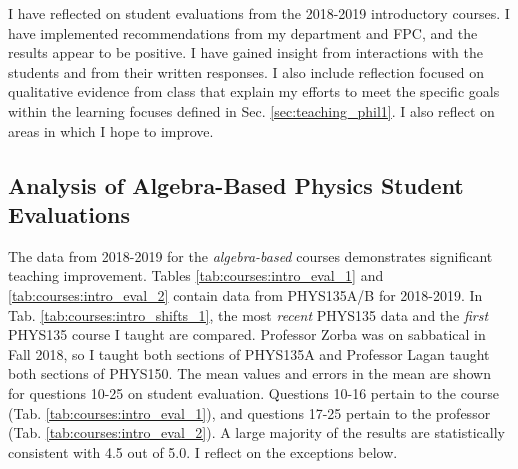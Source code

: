 \documentclass[../../main.tex]{subfiles}
\begin{document}
\label{sec:oof}

I have reflected on student evaluations from the 2018-2019 introductory courses.  I have implemented recommendations from my department and FPC, and the results appear to be positive.  I have gained insight from interactions with the students and from their written responses.  I also include reflection focused on qualitative evidence from class that explain my efforts to meet the specific goals within the learning focuses defined in Sec. \ref{sec:teaching_phil1}.  I also reflect on areas in which I hope to improve.  \\ \hspace{0.1cm}

\subsection{Analysis of Algebra-Based Physics Student Evaluations}

The data from 2018-2019 for the \textit{algebra-based} courses demonstrates significant teaching improvement.  Tables \ref{tab:courses:intro_eval_1} and \ref{tab:courses:intro_eval_2} contain data from PHYS135A/B for 2018-2019.  In Tab. \ref{tab:courses:intro_shifts_1}, the most \textit{recent} PHYS135 data and the \textit{first} PHYS135 course I taught are compared.  Professor Zorba was on sabbatical in Fall 2018, so I taught both sections of PHYS135A and Professor Lagan taught both sections of PHYS150.  The mean values and errors in the mean are shown for questions 10-25 on student evaluation.  Questions 10-16 pertain to the course (Tab. \ref{tab:courses:intro_eval_1}), and questions 17-25 pertain to the professor (Tab. \ref{tab:courses:intro_eval_2}).  A large majority of the results are statistically consistent with 4.5 out of 5.0.  I reflect on the exceptions below. \\ \hspace{0.1cm}
\end{document}
